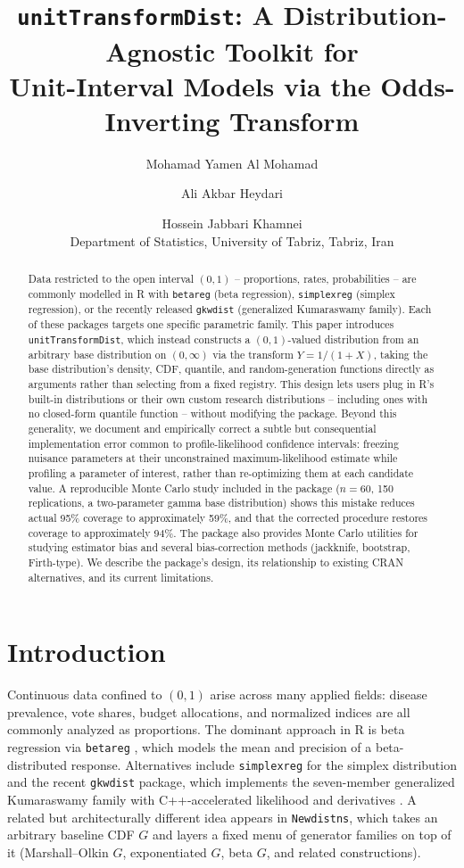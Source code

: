 \documentclass[11pt]{article}
\title{\texttt{unitTransformDist}: A Distribution-Agnostic Toolkit for\\
Unit-Interval Models via the Odds-Inverting Transform}
\author{
  Mohamad Yamen Al Mohamad \and
  Ali Akbar Heydari \and
  Hossein Jabbari Khamnei\\
  \small Department of Statistics, University of Tabriz, Tabriz, Iran
}
\date{}
\begin{document}
\maketitle

\begin{abstract}
\noindent
Data restricted to the open interval $(0,1)$ -- proportions, rates,
probabilities -- are commonly modelled in R with \texttt{betareg} (beta
regression), \texttt{simplexreg} (simplex regression), or the recently
released \texttt{gkwdist} (generalized Kumaraswamy family). Each of these
packages targets one specific parametric family. This paper introduces
\texttt{unitTransformDist}, which instead constructs a $(0,1)$-valued
distribution from an arbitrary base distribution on $(0,\infty)$ via the
transform $Y = 1/(1+X)$, taking the base distribution's density, CDF,
quantile, and random-generation functions directly as arguments rather
than selecting from a fixed registry. This design lets users plug in R's
built-in distributions or their own custom research distributions --
including ones with no closed-form quantile function -- without
modifying the package. Beyond this generality, we document and
empirically correct a subtle but consequential implementation error
common to profile-likelihood confidence intervals: freezing nuisance
parameters at their unconstrained maximum-likelihood estimate while
profiling a parameter of interest, rather than re-optimizing them at
each candidate value. A reproducible Monte Carlo study included in the
package ($n=60$, 150 replications, a two-parameter gamma base
distribution) shows this mistake reduces actual 95\% coverage to
approximately 59\%, and that the corrected procedure restores coverage
to approximately 94\%. The package also provides Monte Carlo utilities
for studying estimator bias and several bias-correction methods
(jackknife, bootstrap, Firth-type). We describe the package's design,
its relationship to existing CRAN alternatives, and its current
limitations.
\end{abstract}

\section{Introduction}

Continuous data confined to $(0,1)$ arise across many applied fields:
disease prevalence, vote shares, budget allocations, and normalized
indices are all commonly analyzed as proportions. The dominant approach
in R is beta regression via \texttt{betareg} \citep{cribarineto2010betareg},
which models the mean and precision of a beta-distributed response.
Alternatives include \texttt{simplexreg} for the simplex distribution
\citep{zhang2016simplexreg} and the recent \texttt{gkwdist} package,
which implements the seven-member generalized Kumaraswamy family with
C++-accelerated likelihood and derivatives
\citep{carrasco2010generalized}. A related but architecturally different
idea appears in \texttt{Newdistns}, which takes an arbitrary baseline
CDF $G$ and layers a fixed menu of generator families on top of it
(Marshall--Olkin $G$, exponentiated $G$, beta $G$, and related
constructions).
\end{document}
